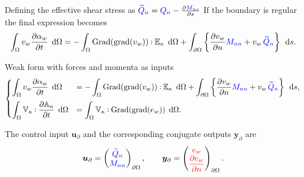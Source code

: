 \documentclass{beamer}
\def\onedot{$\mathsurround0pt\ldotp$}
\def\cddot{%
	\mathbin{\vcenter{\baselineskip.67ex
			\hbox{\onedot}\hbox{\onedot}}%
}}
\newcommand{\blue}[1]{\textcolor{blue}{#1}}
\newcommand{\red}[1]{\textcolor{red}{#1}}
\begin{document}
\begin{frame}
Defining the effective shear stress as $\blue{\widetilde{Q}_n} = \blue{Q_n} - \diffp{\blue{M_{ns}}}{s}$ 
If the boundary is regular the final expression becomes
\small
\begin{equation*}
\int_{\Omega} v_w \diffp{\alpha_w}{t}  \, \d\Omega =  -  \int_{\Omega} \mathrm{Grad}(\mathrm{grad}(v_w))  \cddot \mathbb{E}_{\kappa} \, \d\Omega +  \int_{\partial \Omega} \left\{ \diffp{v_w}{n} \blue{M_{nn}}  + v_w \, \blue{\widetilde{Q}_n} \right\} \, \d{s}. 
\end{equation*}
\normalsize
\begin{exampleblock}{Weak form with forces and momenta as inputs}
	\footnotesize
	\begin{equation*}
	\begin{cases}
	\displaystyle\int_{\Omega} v_w \diffp{\alpha_w}{t} \, \d\Omega  &=  -  \displaystyle\int_{\Omega} \mathrm{Grad}(\mathrm{grad}(v_w))  \cddot \mathbb{E}_{\kappa} \, \d\Omega +  \displaystyle\int_{\partial \Omega} \left\{ \diffp{v_w}{n} \blue{M_{nn}}  + v_w \, \blue{\widetilde{Q}_n} \right\}   \, \d{s},  \vspace{2mm}\\
	\displaystyle\int_{\Omega} \mathbb{V}_{\kappa} \cddot \diffp{\mathbb{A}_{\kappa}}{t} \, \d\Omega &= \displaystyle\int_{\Omega} \mathbb{V}_{\kappa} \cddot \mathrm{Grad}(\mathrm{grad}(e_w)) \, \d\Omega. 
	\end{cases}
	\end{equation*}
\end{exampleblock}

\normalsize
The control input $\bm{u}_\partial$ and the corresponding conjugate outputs $\bm{y}_\partial$ are 
\[\bm{u}_\partial = 
\begin{pmatrix}
\blue{\widetilde{Q}_n} \\
\blue{M_{nn}} \\
\end{pmatrix}_{\partial \Omega}, \qquad
\bm{y}_\partial = 
\begin{pmatrix}
\red{e_w} \\
\displaystyle \red{\diffp{e_w}{n}} \\
\end{pmatrix}_{\partial \Omega}.
\]

\end{frame}
\end{document}
